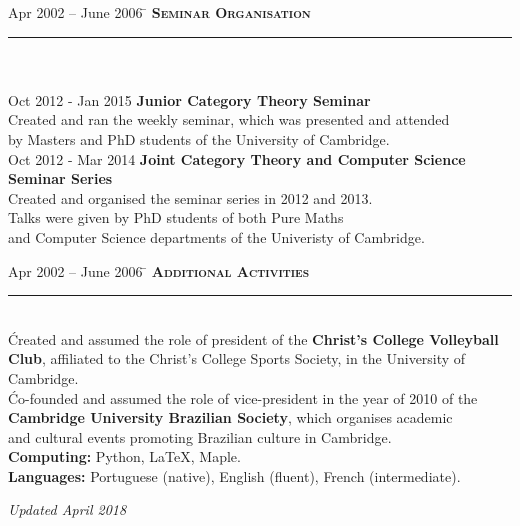 \documentclass[11pt,a4paper]{article}
\begin{document}


\begin{tabbing}
Apr 2002 -- June 2006 \=\kill
\> \textbf{\Large{\textsc{Seminar Organisation}}} \\
\> \noindent\rule{11cm}{1pt}\\
\> \\
\> Oct 2012 - Jan 2015 \' \textbf{Junior Category Theory Seminar} \\
\> Created and ran the weekly seminar, which was presented and attended  \\ \> by Masters and PhD students of the University of Cambridge.\\ [2mm] 
\> Oct 2012 - Mar 2014 \' \textbf{Joint Category Theory and Computer Science Seminar Series}\\ 
\> Created and organised the seminar series in 2012 and 2013. \\ 
\> Talks were given by PhD students of both Pure Maths \\ \> and Computer Science departments of the Univeristy of Cambridge.\\  
\end{tabbing}


\begin{tabbing}
Apr 2002 -- June 2006 \=\kill
\> \textbf{\large{\textsc{Additional Activities}}} \\
\> \noindent\rule{11cm}{1pt}\\
  \' Created and assumed the role of president of the \textbf{Christ's College Volleyball} \\ 
\> \textbf{Club}, affiliated to the Christ's College Sports Society, in the University of \\ \> Cambridge. \\ [2mm]
 \' Co-founded and assumed the role of vice-president in the year of 2010
of the \\ \> \textbf{Cambridge University Brazilian Society}, which organises academic \\ 
\>and cultural events promoting Brazilian culture in Cambridge. \\ [5mm]
\> \textbf{Computing:} Python, \LaTeX, Maple. \\ 
\> \textbf{Languages:} Portuguese (native), English (fluent), French (intermediate). \\  
\end{tabbing}
\vspace*{\fill}
\hspace{3.5cm} \textit{Updated April 2018}
\end{document}

